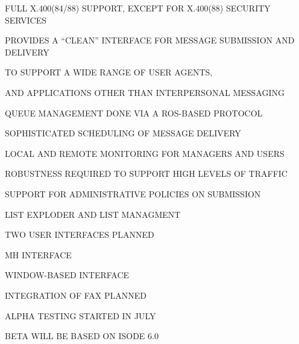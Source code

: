 \begin{bwslide}

\begin{nrtc}
\item	FULL X.400(84/88) SUPPORT, EXCEPT FOR X.400(88) SECURITY SERVICES

\item	PROVIDES A ``CLEAN'' INTERFACE FOR MESSAGE SUBMISSION AND DELIVERY
    \begin{nrtc}
    \item	TO SUPPORT A WIDE RANGE OF USER AGENTS,

    \item	AND APPLICATIONS OTHER THAN INTERPERSONAL MESSAGING
    \end{nrtc}

\item	QUEUE MANAGEMENT DONE VIA A ROS-BASED PROTOCOL
    \begin{nrtc}
    \item	SOPHISTICATED SCHEDULING OF MESSAGE DELIVERY

    \item	LOCAL AND REMOTE MONITORING FOR MANAGERS AND USERS

    \item	ROBUSTNESS REQUIRED TO SUPPORT HIGH LEVELS OF TRAFFIC

    \item	SUPPORT FOR ADMINISTRATIVE POLICIES ON SUBMISSION
    \end{nrtc}

\item	LIST EXPLODER AND LIST MANAGMENT    
\end{nrtc}
\end{bwslide}


\begin{bwslide}

\begin{nrtc}
\item	TWO USER INTERFACES PLANNED
    \begin{nrtc}
    \item	MH INTERFACE

    \item	WINDOW-BASED INTERFACE
    \end{nrtc}

\item	INTEGRATION OF FAX PLANNED

\item	ALPHA TESTING STARTED IN JULY
    \begin{nrtc}
    \item	BETA WILL BE BASED ON ISODE 6.0
    \end{nrtc}
\end{nrtc}
\end{bwslide}



